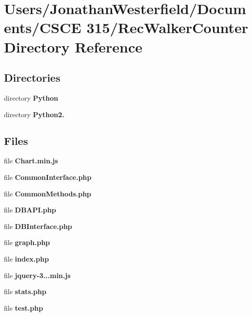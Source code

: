 \section{Users/\+Jonathan\+Westerfield/\+Documents/\+C\+S\+CE 315/\+Rec\+Walker\+Counter Directory Reference}
\label{dir_62688563bdd7e66bca27589a793fe686}
\subsection*{Directories}
\begin{DoxyCompactItemize}
\item 
directory {\bf Python}
\item 
directory {\bf Python2.}
\end{DoxyCompactItemize}
\subsection*{Files}
\begin{DoxyCompactItemize}
\item 
file {\bf Chart.\+min.\+js}
\item 
file {\bf Common\+Interface.\+php}
\item 
file {\bf Common\+Methods.\+php}
\item 
file {\bf D\+B\+A\+P\+I.\+php}
\item 
file {\bf D\+B\+Interface.\+php}
\item 
file {\bf graph.\+php}
\item 
file {\bf index.\+php}
\item 
file {\bf jquery-\/3...\+min.\+js}
\item 
file {\bf stats.\+php}
\item 
file {\bf test.\+php}
\end{DoxyCompactItemize}
